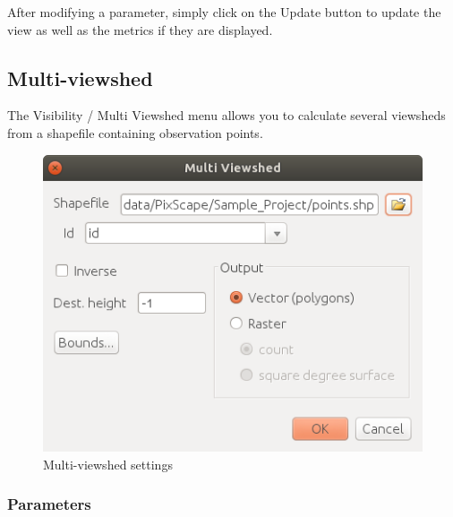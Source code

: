 \documentclass{report}
\begin{document}
After modifying a parameter, simply click on the Update button to update the view as well as the metrics if they are displayed.


\subsection{Multi-viewshed}
\label{multi_viewshed}
The Visibility / Multi Viewshed menu allows you to calculate several viewsheds from a shapefile containing observation points.

\begin{figure}[H]
	\includegraphics[scale=0.5]{img/multi_viewshed-en.png} 
	\caption{Multi-viewshed settings}
	\label{multi_viewshed_dlg}
\end{figure}

\subsubsection{Parameters}
\end{document}
